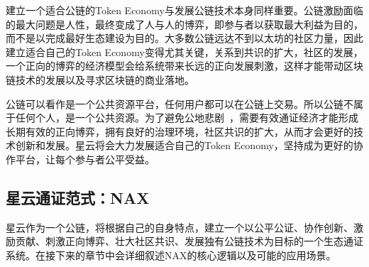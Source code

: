 建立一个适合公链的Token Economy与发展公链技术本身同样重要。公链激励面临的最大问题是人性，最终变成了人与人的博弈，即参与者以获取最大利益为目的，而不是以完成最好生态建设为目的。大多数公链远达不到以太坊的社区力量，因此建立适合自己的Token Economy变得尤其关键，关系到共识的扩大，社区的发展，一个正向的博弈的经济模型会给系统带来长远的正向发展刺激，这样才能带动区块链技术的发展以及寻求区块链的商业落地。

公链可以看作是一个公共资源平台，任何用户都可以在公链上交易。所以公链不属于任何个人，是一个公共资源。为了避免公地悲剧~\cite{TragedyOfTheCommons}，需要有效通证经济才能形成长期有效的正向博弈，拥有良好的治理环境，社区共识的扩大，从而才会更好的技术创新和发展。星云将会大力发展适合自己的Token Economy，坚持成为更好的协作平台，让每个参与者公平受益。

\subsection{星云通证范式：NAX}
星云作为一个公链，将根据自己的自身特点，建立一个以公平公证、协作创新、激励贡献、刺激正向博弈、壮大社区共识、发展独有公链技术为目标的一个生态通证系统。在接下来的章节中会详细叙述NAX的核心逻辑以及可能的应用场景。
